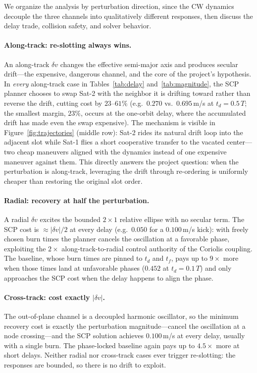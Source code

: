 \documentclass[10pt,twocolumn,letterpaper]{article}
\begin{document}
We organize the analysis by perturbation direction, since the CW dynamics
decouple the three channels into qualitatively different responses, then
discuss the delay trade, collision safety, and solver behavior.

\paragraph{Along-track: re-slotting always wins.}
An along-track $\delta v$ changes the effective semi-major axis and produces
secular drift---the expensive, dangerous channel, and the core of the
project's hypothesis. In \emph{every} along-track case in
Tables~\ref{tab:delay} and~\ref{tab:magnitude}, the SCP planner chooses to
swap Sat-2 with the neighbor it is drifting toward rather than reverse the
drift, cutting cost by $23$--$61\%$ (e.g.\ $0.270$ vs.\ $0.695$\,m/s at
$t_d = 0.5\,T$; the smallest margin, $23\%$, occurs at the one-orbit delay,
where the accumulated drift has made even the swap expensive). The mechanism is visible in
Figure~\ref{fig:trajectories} (middle row): Sat-2 rides its natural drift
loop into the adjacent slot while Sat-1 flies a short cooperative transfer to
the vacated center---two cheap maneuvers aligned with the dynamics instead of
one expensive maneuver against them. This directly answers the project
question: when the perturbation is along-track, leveraging the drift through
re-ordering is uniformly cheaper than restoring the original slot order.

\paragraph{Radial: recovery at half the perturbation.}
A radial $\delta v$ excites the bounded $2{\times}1$ relative ellipse with no
secular term. The SCP cost is $\approx|\delta v|/2$ at every delay
(e.g.\ $0.050$ for a $0.100$\,m/s kick): with freely chosen burn times the
planner cancels the oscillation at a favorable phase, exploiting the
$2{\times}$ along-track-to-radial control authority of the Coriolis coupling.
The baseline, whose burn times are pinned to $t_d$ and $t_f$, pays up to
$9\times$ more when those times land at unfavorable phases ($0.452$ at
$t_d = 0.1\,T$) and only approaches the SCP cost when the delay happens to
align the phase.

\paragraph{Cross-track: cost exactly $|\delta v|$.}
The out-of-plane channel is a decoupled harmonic oscillator, so the minimum
recovery cost is exactly the perturbation magnitude---cancel the oscillation
at a node crossing---and the SCP solution achieves $0.100$\,m/s at every
delay, usually with a single burn. The phase-locked baseline again pays up to
$4.5\times$ more at short delays. Neither radial nor cross-track cases ever
trigger re-slotting: the responses are bounded, so there is no drift to
exploit.
\end{document}
